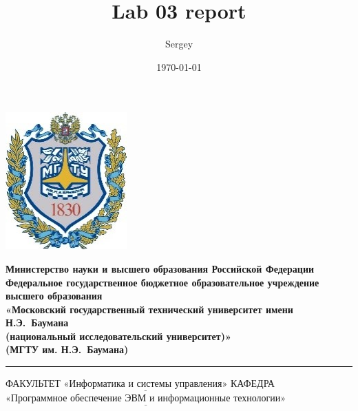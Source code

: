 \documentclass[14pt,russian]{scrartcl}
\title{Lab 03 report}
\author{Sergey}
\date{\today}
\begin{document}
\thispagestyle{empty}

\noindent \begin{minipage}{0.15\textwidth}
	\includegraphics[width=\linewidth]{b_logo}
\end{minipage}
\noindent\begin{minipage}{0.85\textwidth}\centering
	\textbf{Министерство науки и высшего образования Российской Федерации}\\
	\textbf{Федеральное государственное бюджетное образовательное учреждение высшего образования}\\
	\textbf{«Московский государственный технический университет имени Н.Э.~Баумана}\\
	\textbf{(национальный исследовательский университет)»}\\
	\textbf{(МГТУ им. Н.Э.~Баумана)}
\end{minipage}

\noindent\rule{16cm}{3pt}
\newline\newline
\noindent ФАКУЛЬТЕТ $\underline{\text{«Информатика и системы управления»}}$ \newline\newline
\noindent КАФЕДРА $\underline{\text{«Программное обеспечение ЭВМ и информационные технологии»}}$\newline\newline
\end{document}
